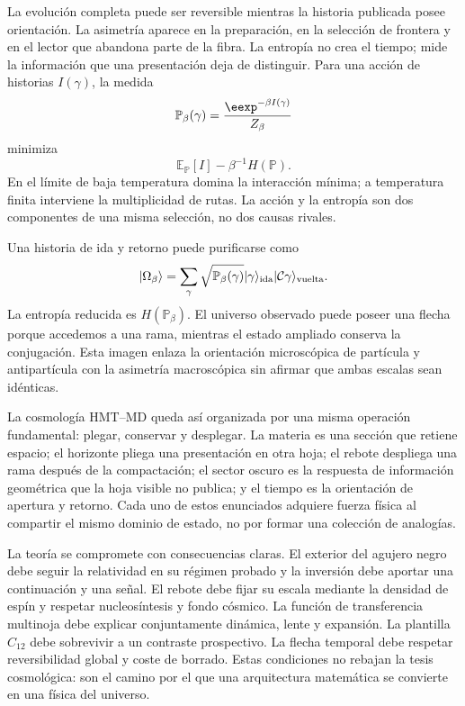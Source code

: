 La evolución completa puede ser reversible mientras la historia publicada posee
orientación. La asimetría aparece en la preparación, en la selección de frontera y
en el lector que abandona parte de la fibra. La entropía no crea el tiempo; mide la
información que una presentación deja de distinguir. Para una acción de historias
\(I(\gamma)\), la medida
\[
 \mathbb P_\beta(\gamma)
 =
 \frac{\eexp^{-\beta I(\gamma)}}{Z_\beta}
\]
minimiza
\[
 \mathbb E_{\mathbb P}[I]
 -
 \beta^{-1}H(\mathbb P).
\]
En el límite de baja temperatura domina la interacción mínima; a temperatura
finita interviene la multiplicidad de rutas. La acción y la entropía son dos
componentes de una misma selección, no dos causas rivales.

Una historia de ida y retorno puede purificarse como
\[
 |\Omega_\beta\rangle
 =
 \sum_\gamma
 \sqrt{\mathbb P_\beta(\gamma)}
 |\gamma\rangle_{\rm ida}
 |\mathcal C\gamma\rangle_{\rm vuelta}.
\]
La entropía reducida es \(H(\mathbb P_\beta)\). El universo observado puede poseer
una flecha porque accedemos a una rama, mientras el estado ampliado conserva la
conjugación. Esta imagen enlaza la orientación microscópica de partícula y
antipartícula con la asimetría macroscópica sin afirmar que ambas escalas sean
idénticas.

La cosmología HMT--MD queda así organizada por una misma operación fundamental:
plegar, conservar y desplegar. La materia es una sección que retiene espacio; el
horizonte pliega una presentación en otra hoja; el rebote despliega una rama después
de la compactación; el sector oscuro es la respuesta de información geométrica que
la hoja visible no publica; y el tiempo es la orientación de apertura y retorno.
Cada uno de estos enunciados adquiere fuerza física al compartir el mismo dominio de
estado, no por formar una colección de analogías.

La teoría se compromete con consecuencias claras. El exterior del agujero negro debe
seguir la relatividad en su régimen probado y la inversión debe aportar una
continuación y una señal. El rebote debe fijar su escala mediante la densidad de
espín y respetar nucleosíntesis y fondo cósmico. La función de transferencia
multinoja debe explicar conjuntamente dinámica, lente y expansión. La plantilla
\(C_{12}\) debe sobrevivir a un contraste prospectivo. La flecha temporal debe
respetar reversibilidad global y coste de borrado. Estas condiciones no rebajan la
tesis cosmológica: son el camino por el que una arquitectura matemática se convierte
en una física del universo.

